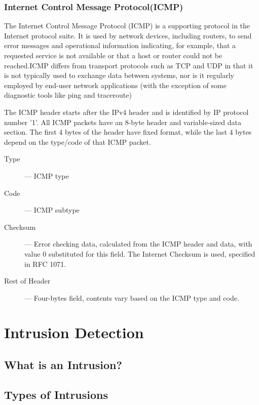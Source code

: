 \documentclass[12pt]{article}
\theoremstyle{definition}
\begin{document}
			\subsubsection{Internet Control Message Protocol(ICMP)}
			The Internet Control Message Protocol (ICMP) is a supporting protocol in the Internet protocol suite. It is used by network devices, including routers, to send error messages and operational information indicating, for example, that a requested service is not available or that a host or router could not be reached.ICMP differs from transport protocols such as TCP and UDP in that it is not typically used to exchange data between systems, nor is it regularly employed by end-user network applications (with the exception of some diagnostic tools like ping and traceroute)
			
			The ICMP header starts after the IPv4 header and is identified by IP protocol number '1'. All ICMP packets have an 8-byte header and variable-sized data section. The first 4 bytes of the header have fixed format, while the last 4 bytes depend on the type/code of that ICMP packet.
			
			
			\begin{description}
				\item [Type ] --- ICMP type
				\item [Code ] --- ICMP subtype
				\item [Checksum] --- Error checking data, calculated from the ICMP header and data, with value 0 substituted for this field. The Internet Checksum is used, specified in RFC 1071.
				\item [Rest of Header] --- Four-bytes field, contents vary based on the ICMP type and code.
			\end{description}
			
	\cleardoublepage
	\section{Intrusion Detection}\label{sec:i-detection}
	\lipsum[1-2]
		\subsection{What is an Intrusion?}
		\lipsum[1-2]
		
		\subsection{Types of Intrusions}
		\lipsum[1]
\end{document}
